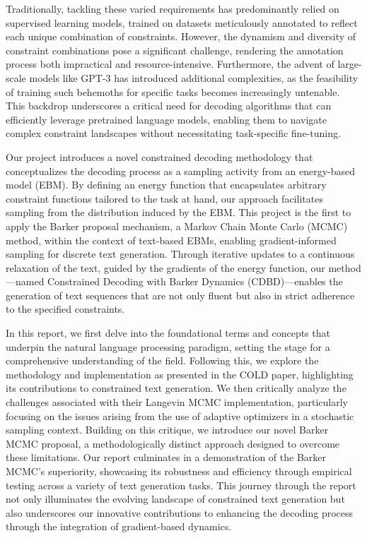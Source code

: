 \documentclass{article}
\begin{document}
Traditionally, tackling these varied requirements has predominantly relied on supervised learning models, trained on datasets meticulously annotated to reflect each unique combination of constraints. However, the dynamism and diversity of constraint combinations pose a significant challenge, rendering the annotation process both impractical and resource-intensive. Furthermore, the advent of large-scale models like GPT-3 has introduced additional complexities, as the feasibility of training such behemoths for specific tasks becomes increasingly untenable. This backdrop underscores a critical need for decoding algorithms that can efficiently leverage pretrained language models, enabling them to navigate complex constraint landscapes without necessitating task-specific fine-tuning.

Our project introduces a novel constrained decoding methodology that conceptualizes the decoding process as a sampling activity from an energy-based model (EBM). By defining an energy function that encapsulates arbitrary constraint functions tailored to the task at hand, our approach facilitates sampling from the distribution induced by the EBM. This project is the first to apply the Barker proposal mechanism, a Markov Chain Monte Carlo (MCMC) method, within the context of text-based EBMs, enabling gradient-informed sampling for discrete text generation. Through iterative updates to a continuous relaxation of the text, guided by the gradients of the energy function, our method—named Constrained Decoding with Barker Dynamics (CDBD)—enables the generation of text sequences that are not only fluent but also in strict adherence to the specified constraints.

In this report, we first delve into the foundational terms and concepts that underpin the natural language processing paradigm, setting the stage for a comprehensive understanding of the field. Following this, we explore the methodology and implementation as presented in the COLD paper, highlighting its contributions to constrained text generation. We then critically analyze the challenges associated with their Langevin MCMC implementation, particularly focusing on the issues arising from the use of adaptive optimizers in a stochastic sampling context. Building on this critique, we introduce our novel Barker MCMC proposal, a methodologically distinct approach designed to overcome these limitations. Our report culminates in a demonstration of the Barker MCMC's superiority, showcasing its robustness and efficiency through empirical testing across a variety of text generation tasks. This journey through the report not only illuminates the evolving landscape of constrained text generation but also underscores our innovative contributions to enhancing the decoding process through the integration of gradient-based dynamics.
\end{document}
